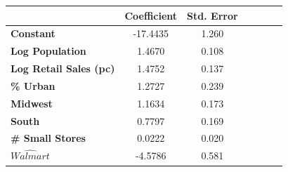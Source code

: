 \begin{center}
\begin{tabular}{lcccccc}
                                & \textbf{Coefficient} & \textbf{Std. Error} \\
\midrule
\textbf{Constant}                  &     -17.4435  &        1.260      \\
\textbf{Log Population}               &       1.4670  &        0.108      \\
\textbf{Log Retail Sales (pc)} &       1.4752  &        0.137      \\
\textbf{\% Urban}             &       1.2727  &        0.239      \\
\textbf{Midwest}                &       1.1634  &        0.173      \\
\textbf{South}                  &       0.7797  &        0.169      \\
\textbf{\# Small Stores}       &       0.0222  &        0.020      \\
\textbf{$\hat{Walmart}$}     &      -4.5786  &        0.581      \\
\bottomrule
\end{tabular}
\end{center}
